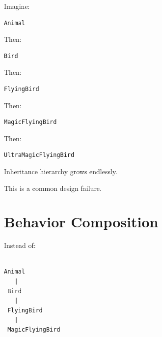 \documentclass[11pt,a4paper]{book}
\begin{document}
Imagine:

\begin{verbatim}
Animal
\end{verbatim}


Then:

\begin{verbatim}
Bird
\end{verbatim}


Then:

\begin{verbatim}
FlyingBird
\end{verbatim}


Then:

\begin{verbatim}
MagicFlyingBird
\end{verbatim}


Then:

\begin{verbatim}
UltraMagicFlyingBird
\end{verbatim}


Inheritance hierarchy grows endlessly.


This is a common design failure.


\section{Behavior Composition}

Instead of:

\begin{verbatim}

Animal
   |
 Bird
   |
 FlyingBird
   |
 MagicFlyingBird

\end{verbatim}

\end{document}
